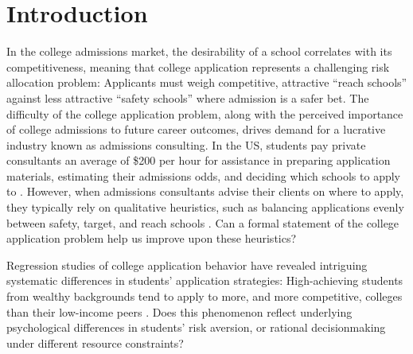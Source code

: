 \section{Introduction}

In the college admissions market, the desirability of a school correlates with its competitiveness, meaning that college application represents a challenging risk allocation problem: Applicants must weigh competitive, attractive ``reach schools'' against less attractive ``safety schools'' where admission is a safer bet. The difficulty of the college application problem, along with the perceived importance of college admissions to future career outcomes, drives demand for a lucrative industry known as admissions consulting. In the US, students pay private consultants an average of \$200 per hour for assistance in preparing application materials, estimating their admissions odds, and deciding which schools to apply to \cite{sklarow2018}. However, when admissions consultants advise their clients on where to apply, they typically rely on qualitative heuristics, such as balancing applications evenly between safety, target, and reach schools \cite{jeon2015,peck2021}. Can a formal statement of the college application problem help us improve upon these heuristics? 

Regression studies of college application behavior have revealed intriguing systematic differences in students' application strategies: High-achieving students from wealthy backgrounds tend to apply to more, and more competitive, colleges than their low-income peers \cite{hartlaubandschneider2012,vanhuizenandalessie2019}. Does this phenomenon reflect underlying psychological differences in students' risk aversion, or rational decisionmaking under different resource constraints? %

